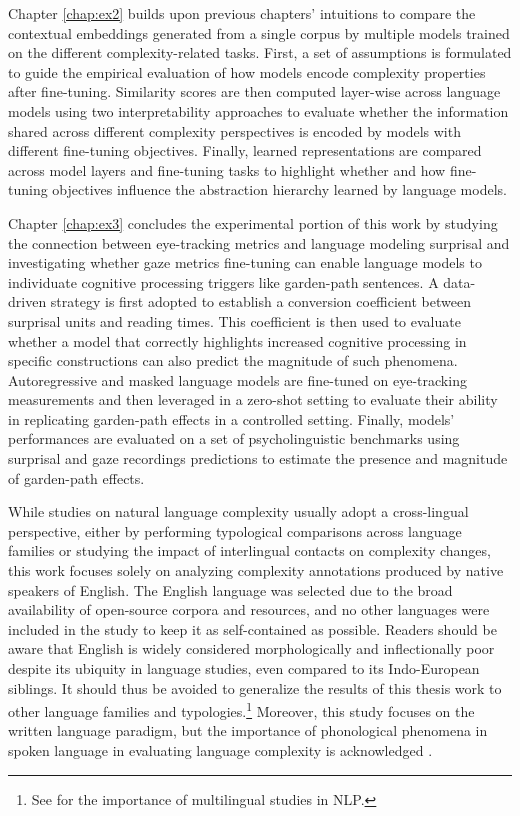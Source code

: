 \documentclass[a4paper, nobind]{templates/ociamthesis}
\begin{document}
Chapter \ref{chap:ex2} builds upon previous chapters' intuitions to compare the contextual embeddings generated from a single corpus by multiple models trained on the different complexity-related tasks. First, a set of assumptions is formulated to guide the empirical evaluation of how models encode complexity properties after fine-tuning. Similarity scores are then computed layer-wise across language models using two interpretability approaches to evaluate whether the information shared across different complexity perspectives is encoded by models with different fine-tuning objectives. Finally, learned representations are compared across model layers and fine-tuning tasks to highlight whether and how fine-tuning objectives influence the abstraction hierarchy learned by language models.

Chapter \ref{chap:ex3} concludes the experimental portion of this work by studying the connection between eye-tracking metrics and language modeling surprisal and investigating whether gaze metrics fine-tuning can enable language models to individuate cognitive processing triggers like garden-path sentences. A data-driven strategy is first adopted to establish a conversion coefficient between surprisal units and reading times. This coefficient is then used to evaluate whether a model that correctly highlights increased cognitive processing in specific constructions can also predict the magnitude of such phenomena. Autoregressive and masked language models are fine-tuned on eye-tracking measurements and then leveraged in a zero-shot setting to evaluate their ability in replicating garden-path effects in a controlled setting. Finally, models' performances are evaluated on a set of psycholinguistic benchmarks using surprisal and gaze recordings predictions to estimate the presence and magnitude of garden-path effects.

While studies on natural language complexity usually adopt a cross-lingual perspective, either by performing typological comparisons across language families or studying the impact of interlingual contacts on complexity changes, this work focuses solely on analyzing complexity annotations produced by native speakers of English. The English language was selected due to the broad availability of open-source corpora and resources, and no other languages were included in the study to keep it as self-contained as possible. Readers should be aware that English is widely considered morphologically and inflectionally poor despite its ubiquity in language studies, even compared to its Indo-European siblings. It should thus be avoided to generalize the results of this thesis work to other language families and typologies.\footnote{See \textcite{ruder-2020-beyond} for the importance of multilingual studies in NLP.} Moreover, this study focuses on the written language paradigm, but the importance of phonological phenomena in spoken language in evaluating language complexity is acknowledged \autocite{mcwhorter-2001-world}.
\end{document}
